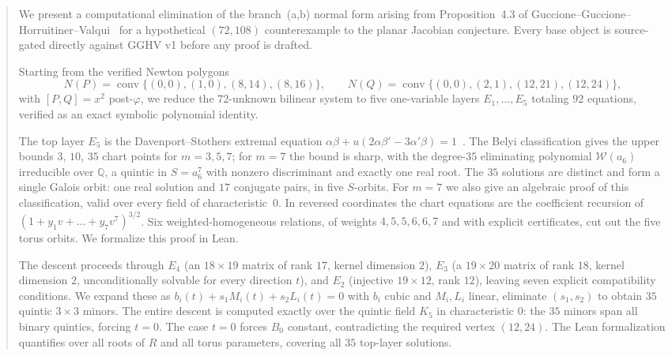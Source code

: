 \documentclass[a4paper,11pt]{article}
\theoremstyle{plain}
\theoremstyle{definition}
\theoremstyle{remark}
\begin{document}
\begin{abstract}
We present a computational elimination of the branch~(a,b) normal form arising from Proposition~4.3 of Guccione--Guccione--Horruitiner--Valqui~\cite{GGHV} for a hypothetical $(72,108)$ counterexample to the planar Jacobian conjecture. Every base object is source-gated directly against GGHV v1 before any proof is drafted.

Starting from the verified Newton polygons
\[
N(P)=\operatorname{conv}\{(0,0),(1,0),(8,14),(8,16)\},\qquad
N(Q)=\operatorname{conv}\{(0,0),(2,1),(12,21),(12,24)\},
\]
with $[P,Q]=x^2$ post-$\varphi$, we reduce the $72$-unknown bilinear system to five one-variable layers $E_1,\dots,E_5$ totaling $92$ equations, verified as an exact symbolic polynomial identity.

The top layer $E_5$ is the Davenport--Stothers extremal equation $\alpha\beta+u(2\alpha\beta'-3\alpha'\beta)=1$~\cite{Stothers,Davenport}. The Belyi classification gives the upper bounds $3$, $10$, $35$ chart points for $m=3,5,7$; for $m=7$ the bound is sharp, with the degree-$35$ eliminating polynomial $\mathcal{W}(a_6)$ irreducible over $\mathbb{Q}$, a quintic in $S=a_6^7$ with nonzero discriminant and exactly one real root. The $35$ solutions are distinct and form a single Galois orbit: one real solution and $17$ conjugate pairs, in five $S$-orbits. For $m=7$ we also give an algebraic proof of this classification, valid over every field of characteristic~$0$. In reversed coordinates the chart equations are the coefficient recursion of $(1+y_1v+\dots+y_7v^7)^{3/2}$. Six weighted-homogeneous relations, of weights $4,5,5,6,6,7$ and with explicit certificates, cut out the five torus orbits. We formalize this proof in Lean.

The descent proceeds through $E_4$ (an $18\times19$ matrix of rank $17$, kernel dimension $2$), $E_3$ (a $19\times20$ matrix of rank $18$, kernel dimension $2$, unconditionally solvable for every direction $t$), and $E_2$ (injective $19\times 12$, rank $12$), leaving seven explicit compatibility conditions. We expand these as $b_i(t)+s_1M_i(t)+s_2L_i(t)=0$ with $b_i$ cubic and $M_i,L_i$ linear, eliminate $(s_1,s_2)$ to obtain $35$ quintic $3\times3$ minors. The entire descent is computed exactly over the quintic field $K_5$ in characteristic $0$: the $35$ minors span all binary quintics, forcing $t=0$. The case $t=0$ forces $B_0$ constant, contradicting the required vertex $(12,24)$. The Lean formalization quantifies over all roots of $R$ and all torus parameters, covering all $35$ top-layer solutions.


\end{abstract}
\end{document}
